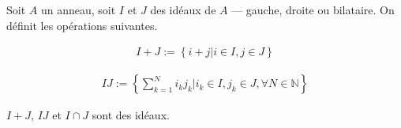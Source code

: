 \begin{defn}
Soit $A$ un anneau, soit $I$ et $J$ des idéaux de $A$ --- gauche, droite ou bilataire. On définit les opérations suivantes.

\begin{align*}
I+J:=\left\{i+j | i\in I, j\in J\right\}
\end{align*}

\begin{align*}
IJ:=\left\{\sum\limits_{k=1}^N i_kj_k | i_k\in I, j_k\in J, \forall N\in\mathbb{N}\right\}
\end{align*}

$I+J$, $IJ$ et $I\cap J$ sont des idéaux.
\end{defn}

